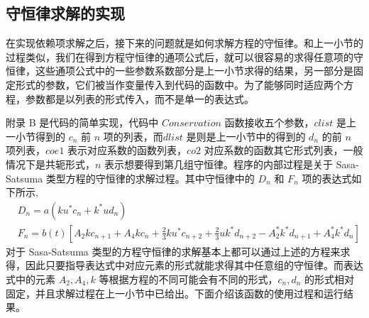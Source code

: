 \subsection{守恒律求解的实现}
在实现依赖项求解之后，接下来的问题就是如何求解方程的守恒律。和上一小节的过程类似，我们在得到方程守恒律的通项公式后，就可以很容易的求得任意项的守恒律，这些通项公式中的一些参数系数部分是上一小节求得的结果，另一部分是固定形式的参数，它们被当作变量传入到代码的函数中。为了能够同时适应两个方程，参数都是以列表的形式传入，而不是单一的表达式。

附录 B 是代码的简单实现，代码中 $Conservation$ 函数接收五个参数，$clist$ 是上一小节得到的 $c_n$ 前 $n$ 项的列表，而$dlist$ 是则是上一小节中的得到的 $d_n$ 的前 $n$ 项列表，$coe1$ 表示对应系数的函数列表，$co2$ 对应系数的函数其它形式列表，一般情况下是共轭形式，$n$ 表示想要得到第几组守恒律。程序的内部过程是关于 Sasa-Satsuma 类型方程的守恒律的求解过程。其中守恒律中的 $D_n$ 和 $F_n$ 项的表达式如下所示,
\begin{align}
  & D_{n} = a(ku^{*}c_{n} + k^{*}ud_{n}) \\
  & F_{n} = b(t)\left[A_{2}kc_{n+1} + A_{4}kc_{n} + \frac{2}{3}ku^{*}c_{n+2} + \frac{2}{3}uk^{*}d_{n+2} - A_{2}^{*}k^{*}d_{n+1} + A_{4}^{*}k^{*}d_{n}\right]
\end{align}
对于 Sasa-Satsuma 类型的方程守恒律的求解基本上都可以通过上述的方程来求得，因此只要指导表达式中对应元素的形式就能求得其中任意组的守恒律。而表达式中的元素 $A_2, A_4, k$ 等根据方程的不同可能会有不同的形式，$c_n, d_n$ 的形式相对固定，并且求解过程在上一小节中已给出。下面介绍该函数的使用过程和运行结果。

